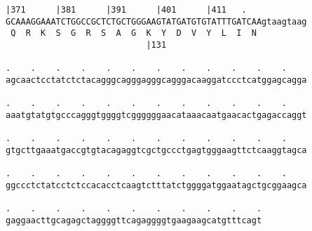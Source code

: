 \documentclass{article}
\begin{document}
\newpage
\begin{Verbatim}[fontfamily=courier]
        |371      |381      |391      |401      |411   .    
GCAAAGGAAATCTGGCCGCTCTGCTGGGAAGTATGATGTGTATTTGATCAAgtaagtaag
 Q  R  K  S  G  R  S  A  G  K  Y  D  V  Y  L  I  N          
                            |131                            

.    .    .    .    .    .    .    .    .    .    .    .    
agcaactcctatctctacagggcagggagggcagggacaaggatccctcatggagcagga

.    .    .    .    .    .    .    .    .    .    .    .    
aaatgtatgtgcccagggtggggtcggggggaacataaacaatgaacactgagaccaggt

.    .    .    .    .    .    .    .    .    .    .    .    
gtgcttgaaatgaccgtgtacagaggtcgctgccctgagtgggaagttctcaaggtagca

.    .    .    .    .    .    .    .    .    .    .    .    
ggccctctatcctctccacacctcaagtctttatctggggatggaatagctgcggaagca

.    .    .    .    .    .    .    .    .    .    .
gaggaacttgcagagctaggggttcagaggggtgaagaagcatgtttcagt
\end{Verbatim}
\newpage
\end{document}
